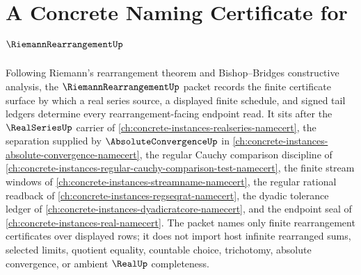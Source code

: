 \chapter{A Concrete Naming Certificate for $\RiemannRearrangementUp$}
\label{ch:concrete-instances-riemann-rearrangement-namecert}

Following Riemann's rearrangement theorem and Bishop--Bridges constructive analysis, the $\RiemannRearrangementUp$ packet records the finite certificate surface by which a real series source, a displayed finite schedule, and signed tail ledgers determine every rearrangement-facing endpoint read. It sits after the $\RealSeriesUp$ carrier of \autoref{ch:concrete-instances-realseries-namecert}, the separation supplied by $\AbsoluteConvergenceUp$ in \autoref{ch:concrete-instances-absolute-convergence-namecert}, the regular Cauchy comparison discipline of \autoref{ch:concrete-instances-regular-cauchy-comparison-test-namecert}, the finite stream windows of \autoref{ch:concrete-instances-streamname-namecert}, the regular rational readback of \autoref{ch:concrete-instances-regseqrat-namecert}, the dyadic tolerance ledger of \autoref{ch:concrete-instances-dyadicratcore-namecert}, and the endpoint seal of \autoref{ch:concrete-instances-real-namecert}. The packet names only finite rearrangement certificates over displayed rows; it does not import host infinite rearranged sums, selected limits, quotient equality, countable choice, trichotomy, absolute convergence, or ambient $\RealUp$ completeness.

